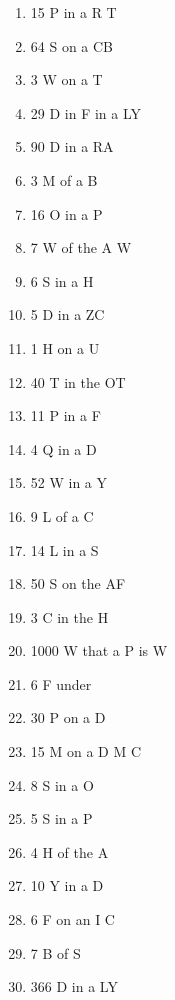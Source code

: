 \documentclass[10pt]{article}
\begin{document}
\begin{multicols}{4}
\begin{enumerate}[label=\arabic*.]
    \item 15 \w P{}  in a \w R{}  T
    \item 64 \w S{}  on a \w CB{}
     \item 3 \w W{}  on a \w T{}
     \item 29 \w D{}  in \w F{}  in a \w LY{}
     \item 90 \w D{}  in a \w RA{}
     
    \item 3 \w M{}  of a \w B{}
     \item 16 \w O{}  in a \w P{}
     \item 7 \w W{}  of the \w A{}  W
    \item 6 \w S{}  in a \w H{}
     \item 5 \w D{}  in a \w ZC{}
     
    \item 1 \w H{}  on a \w U{}
     \item 40 \w T{}  in the \w OT{}
     \item 11 \w P{}  in a \w F{}
     \item 4 \w Q{}  in a \w D{}
     \item 52 \w W{}  in a \w Y{}
     
    \item 9 \w L{}  of a \w C{}
     \item 14 \w L{}  in a \w S{}
     \item 50 \w S{}  on the \w AF{}
     \item 3 \w C{}  in the \w H{}
     \item 1000 \w W{}  that a \w P{}  is \w W{}
     
    \item 6 \w F{}  under
    \item 30 \w P{}  on a \w D{}
     \item 15 \w M{}  on a \w D{}  M \w C{}
     \item 8 \w S{}  in a \w O{}
     \item 5 \w S{}  in a \w P{}
     
    \item 4 \w H{}  of the \w A{}
     \item 10 \w Y{}  in a \w D{}
     \item 6 \w F{}  on an \w I{}  C
    \item 7 \w B{}  of \w S{}
     \item 366 \w D{}  in a \w LY{}
     

\end{enumerate}
\end{multicols}
\end{document}
